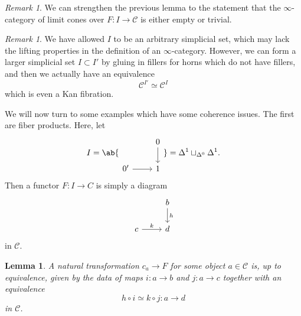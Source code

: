 \documentclass[10pt, oneside]{memoir}
\newtheorem{lem}[thm]{Lemma}
\theoremstyle{definition}
\theoremstyle{remark}
\newtheorem{rmk}[thm]{Remark}
\theoremstyle{plain}
\theoremstyle{definition}
\theoremstyle{remark}
\newcommand{\mc}[1]{\mathcal{#1}}
\newcommand{\1}{\mathbf{1}}
\newcommand{\2}{\mathbf{2}}
\newcommand{\3}{\mathbf{3}}
\begin{document}
\begin{rmk}
    We can strengthen the previous lemma to the statement that the \(\infty \)-category of limit cones over \(F \colon I \to \mc{C} \) is either empty or trivial.
\end{rmk}

\begin{rmk}
    We have allowed \(I \) to be an arbitrary simplicial set, which may lack the lifting properties in the definition of an \(\infty \)-category. However, we can form a larger simplicial set \(I \subset I' \) by gluing in fillers for horns which do not have fillers, and then we actually have an equivalence
    \[ \mc{C}^{I'} \simeq \mc{C}^I \]
    which is even a Kan fibration.
\end{rmk}

We will now turn to some examples which have some coherence issues. The first are fiber products. Here, let
\begin{equation*}I = \ab\{
\begin{tikzcd}[ampersand replacement=\&]
    \& 0 \ar{d} \\
    0' \ar{r} \& 1
\end{tikzcd} \} = \Delta^1 \sqcup_{\Delta^0} \Delta^1.
\end{equation*}
Then a functor \(F \colon I \to C \) is simply a diagram
\begin{equation*}
\begin{tikzcd}
    & b \ar{d}{h} \\
    c \ar{r}{k} & d
\end{tikzcd}
\end{equation*}
in \(\mc{C} \).

\begin{lem}
    A natural transformation \(c_a \to F \) for some object \(a \in \mc{C} \) is, up to equivalence, given by the data of maps \(i \colon a \to b \) and \(j \colon a \to c \) together with an equivalence
    \[ h \circ i \simeq k \circ j \colon a \to d \]
    in \(\mc{C} \). 
\end{lem}
\end{document}
